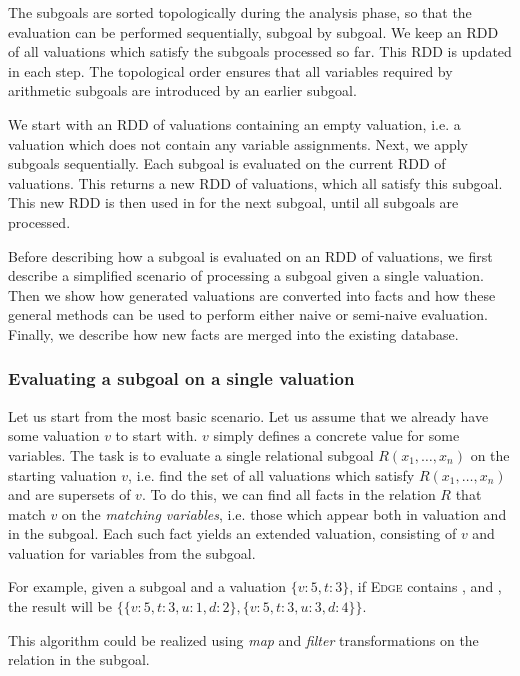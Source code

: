 The subgoals are sorted topologically during the analysis phase, so that the evaluation can be performed sequentially, subgoal by subgoal. We keep an RDD of all valuations which satisfy the subgoals processed so far. This RDD is updated in each step. The topological order ensures that all variables required by arithmetic subgoals are introduced by an earlier subgoal. 

We start with an RDD of valuations containing an empty valuation, i.e. a valuation which does not contain any variable assignments. Next, we apply subgoals sequentially. Each subgoal is evaluated on the current RDD of valuations. This returns a new RDD of valuations, which all satisfy this subgoal. This new RDD is then used in for the next subgoal, until all subgoals are processed.

Before describing how a subgoal is evaluated on an RDD of valuations, we first describe a simplified scenario of processing a subgoal given a single valuation. Then we show how generated valuations are converted into facts and how these general methods can be used to perform either naive or semi-naive evaluation. Finally, we describe how new facts are merged into the existing database.

\subsubsection{Evaluating a subgoal on a single valuation}
Let us start from the most basic scenario. Let us assume that we already have some valuation $v$ to start with. $v$ simply defines a concrete value for some variables. The task is to evaluate a single relational subgoal $R(x_1, \dots, x_n)$ on the starting valuation $v$, i.e. find the set of all valuations which satisfy $R(x_1, \dots, x_n)$ and are supersets of $v$. To do this, we can find all facts in the relation $R$ that match $v$ on the \emph{matching variables}, i.e. those which appear both in valuation and in the subgoal. Each such fact yields an extended valuation, consisting of $v$ and valuation for variables from the subgoal. 

For example, given a subgoal  and a valuation $\{v: 5, t: 3\}$, if \textsc{Edge}  contains ,  and , the result will be $\{\{v: 5, t: 3, u: 1, d: 2\}, \{v: 5, t: 3, u: 3, d: 4\}\}$.

This algorithm could be realized using \emph{map} and \emph{filter} transformations on the relation in the subgoal.

